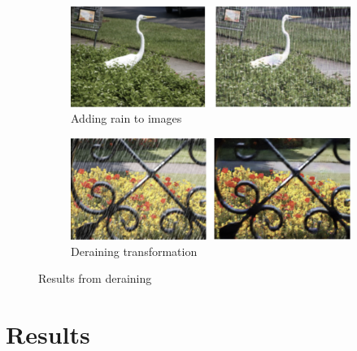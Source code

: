 \documentclass{article}
\begin{document}
\begin{figure}
	\begin{subfigure}{\textwidth}
		\centering
		\includegraphics[width=.9\linewidth]{images/deraining_AtoB}
		\caption{Adding rain to images}
	\end{subfigure}
	\begin{subfigure}{\textwidth}
		\centering
		\includegraphics[width=.9\linewidth]{images/deraining_BtoA}
		\caption{Deraining transformation}
	\end{subfigure}
	\caption{Results from deraining}
	\label{fig:de_raining}
\end{figure}


\section{Results}
\end{document}
